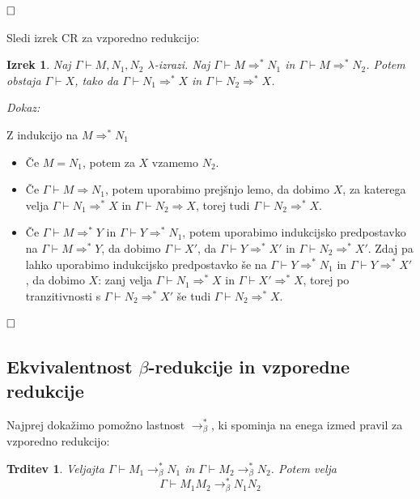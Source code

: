 \documentclass{article}
\def\qed{$\hfill\Box$}   %
\newtheorem{izrek}{Izrek}
\newtheorem{trditev}{Trditev}
\begin{document}
\qed

Sledi izrek CR za vzporedno redukcijo:

\begin{izrek}
    Naj \(\Gamma \vdash M, N_1, N_2\) \(\lambda\)-izrazi. Naj \(\Gamma \vdash M \Rightarrow^* N_1\) in \(\Gamma \vdash M \Rightarrow^* N_2\). Potem obstaja \(\Gamma \vdash X\), tako da \(\Gamma \vdash N_1 \Rightarrow^* X\) in \(\Gamma \vdash N_2 \Rightarrow^* X\).
\end{izrek}

\noindent
{\em Dokaz:\/}

Z indukcijo na \(M \Rightarrow^* N_1\)

\begin{itemize}
    \item Če \(M = N_1\), potem za \(X\) vzamemo \(N_2\).
    \item Če \(\Gamma \vdash M \Rightarrow N_1\), potem uporabimo prejšnjo lemo, da dobimo \(X\), za katerega velja \(\Gamma \vdash N_1 \Rightarrow^* X\) in \(\Gamma \vdash N_2 \Rightarrow X\), torej tudi \(\Gamma \vdash N_2 \Rightarrow^* X\).
    \item Če \(\Gamma \vdash M \Rightarrow^* Y\) in \(\Gamma \vdash Y \Rightarrow^* N_1\), potem uporabimo indukcijsko predpostavko na \(\Gamma \vdash M \Rightarrow^* Y\), da dobimo \(\Gamma \vdash X'\), da \(\Gamma \vdash Y \Rightarrow^* X'\) in \(\Gamma \vdash N_2 \Rightarrow^* X'\). Zdaj pa lahko uporabimo indukcijsko predpostavko še na \(\Gamma \vdash Y \Rightarrow^* N_1\) in \(\Gamma \vdash Y \Rightarrow^* X'\), da dobimo \(X\): zanj velja \(\Gamma \vdash N_1 \Rightarrow^* X\) in \(\Gamma \vdash X' \Rightarrow^* X\), torej po tranzitivnosti s \(\Gamma \vdash N_2 \Rightarrow^* X'\) še tudi \(\Gamma \vdash N_2 \Rightarrow^* X\).
\end{itemize}

\qed


\subsection{Ekvivalentnost \(\beta\)-redukcije in vzporedne redukcije}

Najprej dokažimo pomožno lastnost \(\rightarrow_\beta^*\), ki spominja na enega izmed pravil za vzporedno redukcijo:

\begin{trditev}
    Veljajta \(\Gamma \vdash M_1 \rightarrow_\beta^* N_1\) in \(\Gamma \vdash M_2 \rightarrow_\beta^* N_2\). Potem velja
    \[
        \Gamma \vdash M_1 M_2 \rightarrow_\beta^* N_1 N_2
    \]
\end{trditev}
\end{document}
